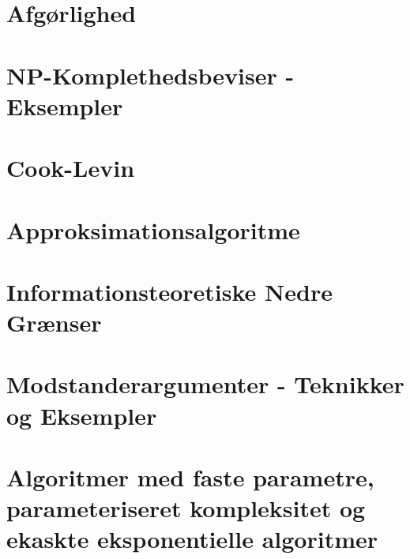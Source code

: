 \section*{Afgørlighed}

\section*{NP-Komplethedsbeviser - Eksempler}

\section*{Cook-Levin}

\section*{Approksimationsalgoritme}

\section*{Informationsteoretiske Nedre Grænser}

\section*{Modstanderargumenter - Teknikker og Eksempler}

\section*{Algoritmer med faste parametre, parameteriseret kompleksitet og ekaskte eksponentielle algoritmer}


\newpage


